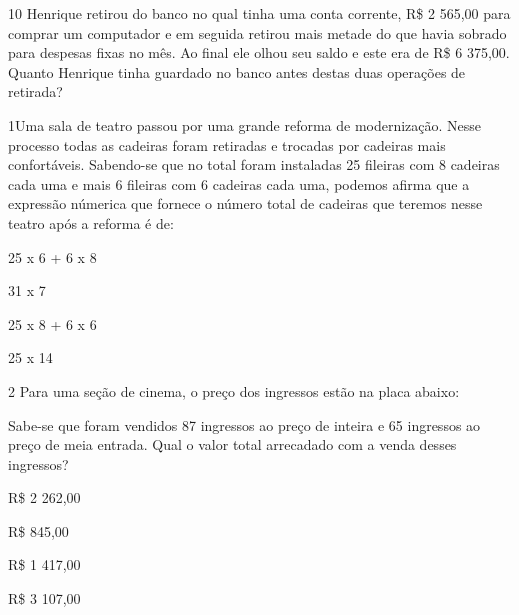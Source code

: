 
\num{10} Henrique retirou do banco no qual tinha uma conta corrente, R\$ 2
565,00 para comprar um computador e em seguida retirou mais metade do
que havia sobrado para despesas fixas no mês. Ao final ele olhou seu
saldo e este era de R\$ 6 375,00. Quanto Henrique tinha guardado no
banco antes destas duas operações de retirada?




\num{1}Uma sala de teatro passou por uma grande reforma de modernização.
Nesse processo todas as cadeiras foram retiradas e trocadas por cadeiras
mais confortáveis. Sabendo-se que no total foram instaladas 25 fileiras
com 8 cadeiras cada uma e mais 6 fileiras com 6 cadeiras cada uma,
podemos afirma que a expressão númerica que fornece o número total de
cadeiras que teremos nesse teatro após a reforma é de:

\begin{escolha}
\item
  25 x 6 + 6 x 8
\item
  31 x 7
\item
  25 x 8 + 6 x 6
\item
  25 x 14
\end{escolha}


\num{2} Para uma seção de cinema, o preço dos ingressos estão na placa
abaixo:


Sabe-se que foram vendidos 87 ingressos ao preço de inteira e 65
ingressos ao preço de meia entrada. Qual o valor total arrecadado com a
venda desses ingressos?

\begin{escolha}
\item
  R\$ 2 262,00
\item
  R\$ 845,00
\item
  R\$ 1 417,00
\item
  R\$ 3 107,00
\end{escolha}

